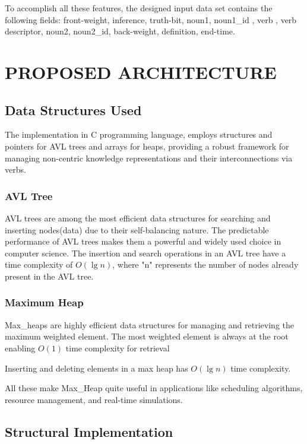 \documentclass[conference]{IEEEtran}
\begin{document}
To accomplish all these features, the designed input data set contains the following fields: front-weight, inference, truth-bit, noun1, noun1\_id , verb , verb descriptor, noun2, noun2\_id, back-weight, definition, end-time.


\section{PROPOSED ARCHITECTURE}

\subsection{\textbf{Data Structures Used}}
The implementation in C programming language\cite{b9}, employs structures and pointers for AVL trees and arrays for heaps, providing a robust framework for managing non-centric knowledge representations and their interconnections via verbs.

\subsubsection{\textbf{AVL Tree}}

AVL trees\cite{b14} are among the most efficient data structures for searching and inserting nodes(data) due to their 
self-balancing nature. The predictable performance of AVL trees makes them a powerful and widely used choice in computer science.
The insertion and search operations in an AVL tree have a time complexity of $O(\lg n)$, 
where "n" represents the number of nodes already present in the AVL tree.


\subsubsection{\textbf{Maximum Heap}}

Max\_heaps\cite{b14} are highly efficient data structures for managing and retrieving the maximum weighted element. 
The most weighted element is always at the root enabling $O(1)$ time complexity for retrieval

Inserting and deleting elements in a max heap has $O(\lg n)$ time complexity.

All these make Max\_Heap quite useful in applications like scheduling algorithms, resource management, and real-time simulations.


\subsection{\textbf{Structural Implementation}}
\end{document}
